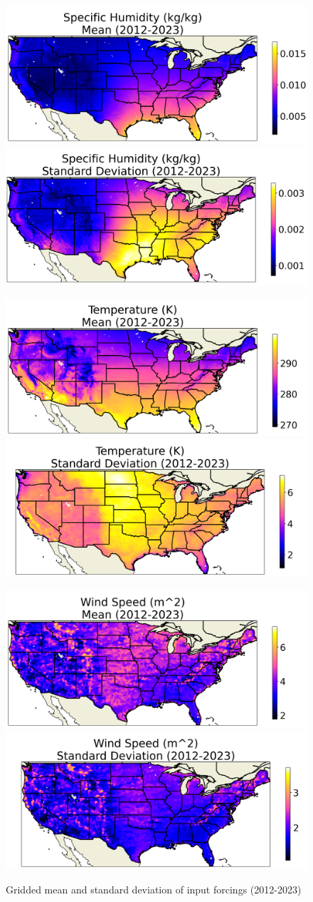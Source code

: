 \begin{figure}[hp!]
    \includegraphics[width=.48\linewidth]{figures/thesis-gridstats/gridstat-bulk_spfh_2012-1_2023-12_y000-195_x000-462_mean.png}
    \includegraphics[width=.48\linewidth]{figures/thesis-gridstats/gridstat-bulk_spfh_2012-1_2023-12_y000-195_x000-462_stdev.png}

    \includegraphics[width=.48\linewidth]{figures/thesis-gridstats/gridstat-bulk_tmp_2012-1_2023-12_y000-195_x000-462_mean.png}
    \includegraphics[width=.48\linewidth]{figures/thesis-gridstats/gridstat-bulk_tmp_2012-1_2023-12_y000-195_x000-462_stdev.png}

    \includegraphics[width=.48\linewidth]{figures/thesis-gridstats/gridstat-bulk_windmag_2012-1_2023-12_y000-195_x000-462_mean.png}
    \includegraphics[width=.48\linewidth]{figures/thesis-gridstats/gridstat-bulk_windmag_2012-1_2023-12_y000-195_x000-462_stdev.png}
    \caption{Gridded mean and standard deviation of input forcings (2012-2023)}
    \label{gs-forcings}
\end{figure}


